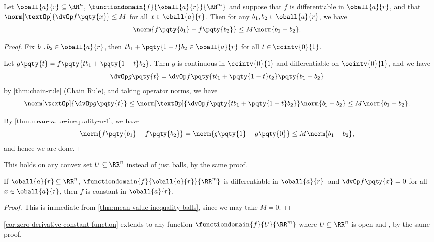 \begin{theorem}
    \label{thm:mean-value-inequality-balls}%
    Let \(\oball{a}{r} \subseteq \RR^n\), \(\functiondomain{f}{\oball{a}{r}}{\RR^m}\) and suppose that \(f\) is differentiable in \(\oball{a}{r}\), and that \(\norm[\textOp]{\dvOp f\pqty{x}} \leq M\) for all \(x \in \oball{a}{r}\). Then for any \(b_1, b_2 \in \oball{a}{r}\), we have
    \[
        \norm{f\pqty{b_1} - f\pqty{b_2}} \leq M \norm{b_1 - b_2}.
    \]
\end{theorem}

\begin{proof}
    Fix \(b_1, b_2 \in \oball{a}{r}\), then \(t b_1 + \pqty{1 - t} b_2 \in \oball{a}{r}\) for all \(t \in \ccintv{0}{1}\).

    Let \(g\pqty{t} = f\pqty{t b_1 + \pqty{1 - t} b_2}\). Then \(g\) is continuous in \(\ccintv{0}{1}\) and differentiable on \(\oointv{0}{1}\), and we have
    \[
        \dvOp g\pqty{t} = \dvOp f\pqty{t b_1 + \pqty{1 - t} b_2} \pqty{b_1 - b_2}
    \]
    by \autoref{thm:chain-rule} (Chain Rule), and taking operator norms, we have
    \[
        \norm[\textOp]{\dvOp g\pqty{t}} \leq \norm[\textOp]{\dvOp f\pqty{t b_1 + \pqty{1 - t} b_2}} \norm{b_1 - b_2} \leq M \norm{b_1 - b_2}.
    \]

    By \autoref{thm:mean-value-inequality-n-1}, we have
    \[
        \norm{f\pqty{b_1} - f\pqty{b_2}} = \norm{g\pqty{1} - g\pqty{0}} \leq M \norm{b_1 - b_2},
    \]
    and hence we are done.
\end{proof}

\begin{remark}
    This holds on any convex set \(U \subseteq \RR^n\) instead of just balls, by the same proof.
\end{remark}

\begin{corollary}
    \label{cor:zero-derivative-constant-function}%
    If \(\oball{a}{r} \subseteq \RR^n\), \(\functiondomain{f}{\oball{a}{r}}{\RR^m}\) is differentiable in \(\oball{a}{r}\), and \(\dvOp f\pqty{x} = 0\) for all \(x \in \oball{a}{r}\), then \(f\) is constant in \(\oball{a}{r}\).
\end{corollary}

\begin{proof}
    This is immediate from \autoref{thm:mean-value-inequality-balls}, since we may take \(M = 0\).
\end{proof}

\begin{remark}
    \autoref{cor:zero-derivative-constant-function} extends to any function \(\functiondomain{f}{U}{\RR^m}\) where \(U \subseteq \RR^n\) is open and , by the same proof.
\end{remark}

